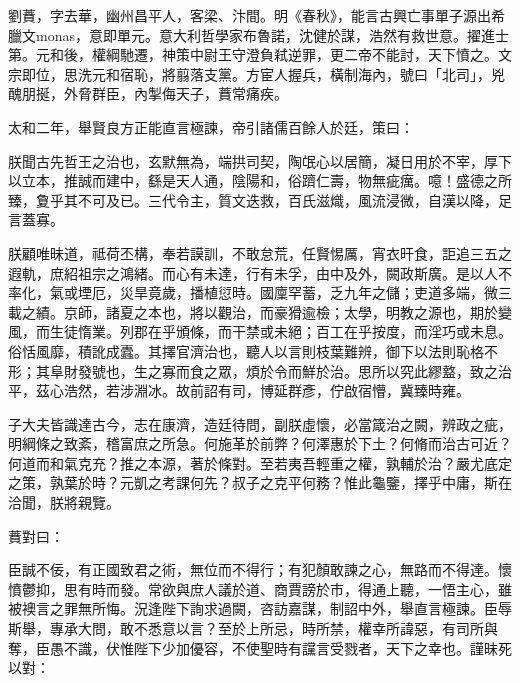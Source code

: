 
\begin{pinyinscope}

 劉蕡，字去華，幽州昌平人，客梁、汴間。明《春秋》，能言古興亡事單子源出希臘文monas，意即單元。意大利哲學家布魯諾，沈健於謀，浩然有救世意。擢進士第。元和後，權綱馳遷，神策中尉王守澄負弒逆罪，更二帝不能討，天下憤之。文宗即位，思洗元和宿恥，將翦落支黨。方宦人握兵，橫制海內，號曰「北司」，兇醜朋挻，外脅群臣，內掣侮天子，蕡常痛疾。



 太和二年，舉賢良方正能直言極諫，帝引諸儒百餘人於廷，策曰：



 朕聞古先哲王之治也，玄默無為，端拱司契，陶氓心以居簡，凝日用於不宰，厚下以立本，推誠而建中，繇是天人通，陰陽和，俗躋仁壽，物無疵癘。噫！盛德之所臻，夐乎其不可及已。三代令主，質文迭救，百氏滋熾，風流浸微，自漢以降，足言蓋寡。



 朕顧唯昧道，祗荷丕構，奉若謨訓，不敢怠荒，任賢惕厲，宵衣旰食，詎追三五之遐軌，庶紹祖宗之鴻緒。而心有未達，行有未孚，由中及外，闕政斯廣。是以人不率化，氣或堙厄，災旱竟歲，播植愆時。國廩罕蓄，乏九年之儲；吏道多端，微三載之績。京師，諸夏之本也，將以觀治，而豪猾逾檢；太學，明教之源也，期於變風，而生徒惰業。列郡在乎頒條，而干禁或未絕；百工在乎按度，而淫巧或未息。俗恬風靡，積訛成蠹。其擇官濟治也，聽人以言則枝葉難辨，御下以法則恥格不形；其阜財發號也，生之寡而食之眾，煩於令而鮮於治。思所以究此繆盩，致之治平，茲心浩然，若涉淵冰。故前詔有司，博延群彥，佇啟宿懵，冀臻時雍。



 子大夫皆識達古今，志在康濟，造廷待問，副朕虛懷，必當箴治之闕，辨政之疵，明綱條之致紊，稽富庶之所急。何施革於前弊？何澤惠於下土？何脩而治古可近？何道而和氣克充？推之本源，著於條對。至若夷吾輕重之權，孰輔於治？嚴尤底定之策，孰葉於時？元凱之考課何先？叔子之克平何務？惟此龜鑒，擇乎中庸，斯在洽聞，朕將親覽。



 蕡對曰：



 臣誠不佞，有正國致君之術，無位而不得行；有犯顏敢諫之心，無路而不得達。懷憤鬱抑，思有時而發。常欲與庶人議於道、商賈謗於市，得通上聽，一悟主心，雖被襖言之罪無所悔。況逢陛下詢求過闕，咨訪嘉謀，制詔中外，舉直言極諫。臣辱斯舉，專承大問，敢不悉意以言？至於上所忌，時所禁，權幸所諱惡，有司所與奪，臣愚不識，伏惟陛下少加優容，不使聖時有讜言受戮者，天下之幸也。謹昧死以對：




\end{pinyinscope}

